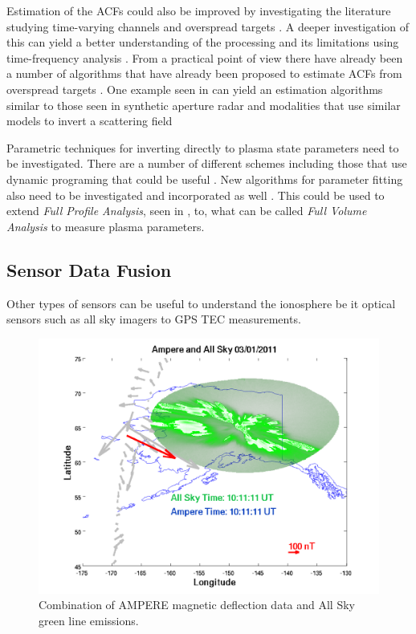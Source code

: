 Estimation of the ACFs could also be improved by investigating the literature studying time-varying channels and overspread targets \cite{Kailath:1962jx,Kailath:1963gh,Pfander:2006hh,Pfander:2015ea}. A deeper investigation of this can yield a better understanding of the processing and its limitations using time-frequency analysis \cite{TFAcohen,Peyrin:1986bh,Jiang:kj}. From a practical point of view there have already been a number of algorithms that have already been proposed to estimate ACFs from overspread targets \cite{Pfander:2015ea,Jiang:kj}. One example seen in \cite{Kay:2003jl} can yield an estimation algorithms similar to those seen in synthetic aperture radar and modalities that use similar models to invert a scattering field \cite{1456966,Ralston:2007hs,richards2014fundamentals}

Parametric techniques for inverting directly to plasma state parameters need to be investigated. There are a number of different schemes including those that use dynamic programing that could be useful \cite{Yau:1992kd,Yau:1993kf,Oktem:2014ju}. New algorithms for parameter fitting also need to be investigated and incorporated as well \cite{Shpynev:2010co}. This could be used to extend \textit{Full Profile Analysis}, seen in \cite{RDS:RDS3308,hysell2008}, to, what can be called \textit{Full Volume Analysis} to measure plasma parameters.

\subsection{Sensor Data Fusion}

Other types of sensors can be useful to understand the ionosphere be it optical sensors such as all sky imagers to GPS TEC measurements. 

\begin{figure}[h!]
\centering
\includegraphics[width=6.0in]{ampandallsky214}
\caption{Combination of AMPERE magnetic deflection data and All Sky green line emissions. }
\label{fig:swflow}
\end{figure}


